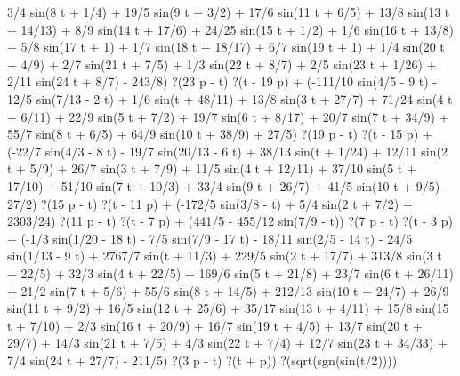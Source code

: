 3/4 sin(8 t + 1/4) + 19/5 sin(9 t + 3/2) + 17/6 sin(11 t + 6/5) + 13/8 sin(13 t + 14/13) + 8/9 sin(14 t + 17/6) + 24/25 sin(15 t + 1/2) + 1/6 sin(16 t + 13/8) + 5/8 sin(17 t + 1) + 1/7 sin(18 t + 18/17) + 6/7 sin(19 t + 1) + 1/4 sin(20 t + 4/9) + 2/7 sin(21 t + 7/5) + 1/3 sin(22 t + 8/7) + 2/5 sin(23 t + 1/26) + 2/11 sin(24 t + 8/7) - 243/8) ?(23 p - t) ?(t - 19 p) + (-111/10 sin(4/5 - 9 t) - 12/5 sin(7/13 - 2 t) + 1/6 sin(t + 48/11) + 13/8 sin(3 t + 27/7) + 71/24 sin(4 t + 6/11) + 22/9 sin(5 t + 7/2) + 19/7 sin(6 t + 8/17) + 20/7 sin(7 t + 34/9) + 55/7 sin(8 t + 6/5) + 64/9 sin(10 t + 38/9) + 27/5) ?(19 p - t) ?(t - 15 p) + (-22/7 sin(4/3 - 8 t) - 19/7 sin(20/13 - 6 t) + 38/13 sin(t + 1/24) + 12/11 sin(2 t + 5/9) + 26/7 sin(3 t + 7/9) + 11/5 sin(4 t + 12/11) + 37/10 sin(5 t + 17/10) + 51/10 sin(7 t + 10/3) + 33/4 sin(9 t + 26/7) + 41/5 sin(10 t + 9/5) - 27/2) ?(15 p - t) ?(t - 11 p) + (-172/5 sin(3/8 - t) + 5/4 sin(2 t + 7/2) + 2303/24) ?(11 p - t) ?(t - 7 p) + (441/5 - 455/12 sin(7/9 - t)) ?(7 p - t) ?(t - 3 p) + (-1/3 sin(1/20 - 18 t) - 7/5 sin(7/9 - 17 t) - 18/11 sin(2/5 - 14 t) - 24/5 sin(1/13 - 9 t) + 2767/7 sin(t + 11/3) + 229/5 sin(2 t + 17/7) + 313/8 sin(3 t + 22/5) + 32/3 sin(4 t + 22/5) + 169/6 sin(5 t + 21/8) + 23/7 sin(6 t + 26/11) + 21/2 sin(7 t + 5/6) + 55/6 sin(8 t + 14/5) + 212/13 sin(10 t + 24/7) + 26/9 sin(11 t + 9/2) + 16/5 sin(12 t + 25/6) + 35/17 sin(13 t + 4/11) + 15/8 sin(15 t + 7/10) + 2/3 sin(16 t + 20/9) + 16/7 sin(19 t + 4/5) + 13/7 sin(20 t + 29/7) + 14/3 sin(21 t + 7/5) + 4/3 sin(22 t + 7/4) + 12/7 sin(23 t + 34/33) + 7/4 sin(24 t + 27/7) - 211/5) ?(3 p - t) ?(t + p)) ?(sqrt(sgn(sin(t/2))))